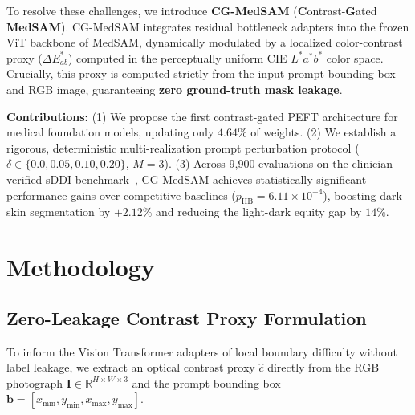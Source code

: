 \documentclass[runningheads]{llncs}
\begin{document}
To resolve these challenges, we introduce \textbf{CG-MedSAM} (\textbf{C}ontrast-\textbf{G}ated \textbf{MedSAM}). CG-MedSAM integrates residual bottleneck adapters into the frozen ViT backbone of MedSAM, dynamically modulated by a localized color-contrast proxy ($\Delta E^*_{ab}$) computed in the perceptually uniform CIE $L^*a^*b^*$ color space. Crucially, this proxy is computed strictly from the input prompt bounding box and RGB image, guaranteeing \textbf{zero ground-truth mask leakage}.

\textbf{Contributions:} (1) We propose the first contrast-gated PEFT architecture for medical foundation models, updating only $4.64\%$ of weights. (2) We establish a rigorous, deterministic multi-realization prompt perturbation protocol ($\delta \in \{0.0, 0.05, 0.10, 0.20\}$, $M=3$). (3) Across 9,900 evaluations on the clinician-verified sDDI benchmark~\cite{carrion2023fedd}, CG-MedSAM achieves statistically significant performance gains over competitive baselines ($p_{\text{HB}} = 6.11 \times 10^{-4}$), boosting dark skin segmentation by $+2.12\%$ and reducing the light-dark equity gap by $14\%$.

\section{Methodology}

\subsection{Zero-Leakage Contrast Proxy Formulation}
To inform the Vision Transformer adapters of local boundary difficulty without label leakage, we extract an optical contrast proxy $\hat{c}$ directly from the RGB photograph $\mathbf{I} \in \mathbb{R}^{H \times W \times 3}$ and the prompt bounding box $\mathbf{b} = [x_{\min}, y_{\min}, x_{\max}, y_{\max}]$.
\end{document}
